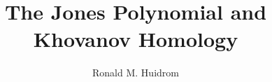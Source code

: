 
\title{The Jones Polynomial and Khovanov Homology}
\author{Ronald M. Huidrom}

\makeatletter
\renewcommand{\@maketitle}{%
  \thispagestyle{empty}%
  \begingroup \topskip\z@skip
  \null
  \centering
  \begingroup
    \LARGE\bfseries
    \@title\par\vspace{30pt}%
    \def\and{\par\medskip}\centering
    \mdseries\scshape\authors\par\vspace{30pt}
  \endgroup
  \begin{center}
    \texttt{[image: images/iisermohali.png]} \\
    \vspace*{30pt}
    A master's thesis \\
    presented to Indian Institute of Science Education and Research Mohali \\
    in fulfillment of the \\
    master's thesis requirement for the \\
    BS-MS Dual Degree \\
    in \\
    Mathematics
  \end{center}
  \vspace*{30pt}
  Mohali, Punjab, India, 2024
  \vfil
  \endgroup
  \newpage
}
\makeatother